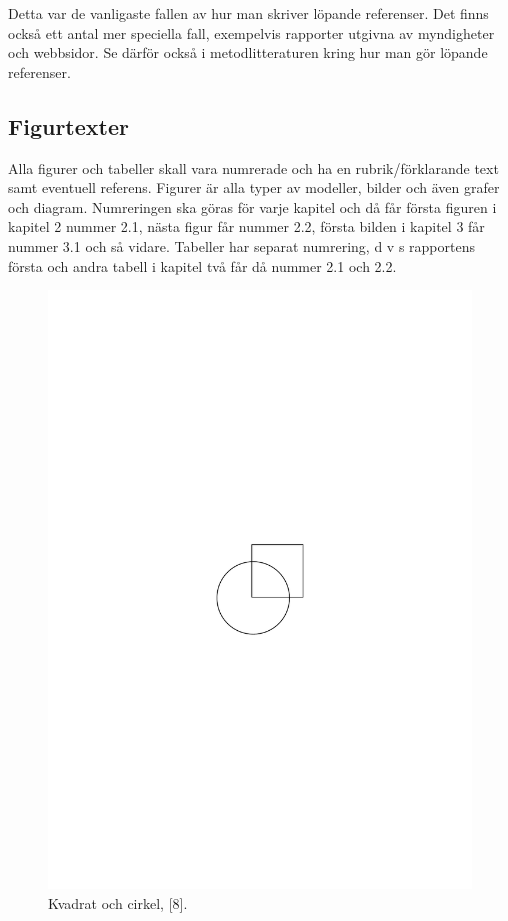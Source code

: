 \documentclass[a4paper,12pt]{article} %
\begin{document}
Detta var de vanligaste fallen av hur man skriver löpande referenser. Det finns också ett antal mer speciella fall, exempelvis rapporter utgivna av myndigheter och webbsidor. Se därför också i metodlitteraturen kring hur man gör löpande referenser. 

\subsection{Figurtexter}
Alla figurer och tabeller skall vara numrerade och ha en rubrik/förklarande text samt eventuell referens. Figurer är alla typer av modeller, bilder och även grafer och diagram. Numreringen ska göras för varje kapitel och då får första figuren i kapitel 2 nummer 2.1, nästa figur får nummer 2.2, första bilden i kapitel 3 får nummer 3.1 och så vidare. Tabeller har separat numrering, d v s rapportens första och andra tabell i kapitel två får då nummer 2.1 och 2.2. 

\begin{figure}[h]
\begin{center}
\includegraphics[scale=0.5]{img/cirkvad}
\end{center}
\caption{Kvadrat och cirkel, [8].} 
\label{cir_kvad}
\end{figure}
\end{document}

